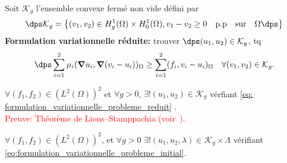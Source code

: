 \documentclass{beamer}
\begin{document}
\begin{frame}
\begin{definition}
Soit $\mathcal{K}_g$ l'ensemble convexe fermé non vide défini par
\vspace{-0.2 cm}
\begin{equation*}
\dps \mathcal{K}_g= \left\{(v_1,v_2)\in H_g^1(\Omega)\times H_0^1(\Omega), v_1-v_2 \geq 0 \quad \mbox{p.p} \quad \mbox{sur} 
\quad \Omega \dps \right\}
\end{equation*}
\textbf{Formulation variationnelle réduite:} trouver $\dps (u_1,u_2)\in \mathcal{K}_g$, tq   
\begin{equation}
\dps \sum_{i=1}^2 \mu_i ({\bm \nabla} u_i,{\bm \nabla} (v_i-u_i))_{\Omega} \geq \sum_{i=1}^2( f_i,v_i-u_i)_{\Omega} \quad \forall (v_1,v_2)\in \mathcal{K}_g.
\label{eq: formulation_variationnelle_probleme_reduit}
\end{equation}
\end{definition}
\begin{theorem}
$\forall (f_1,f_2) \in (L^2(\Omega))^2$ et $\forall g>0$, $\exists ! (u_1,u_2) \in  \displaystyle \mathcal{K}_g$ vérfiant \eqref{eq: formulation_variationnelle_probleme_reduit} .\\
\textcolor{red}{Preuve: Théorème de Lions--Stamppachia (voir~\cite{VorBer:2008}).}
\end{theorem}
\begin{corollary}
$\forall (f_1,f_2) \in (L^2(\Omega))^2$, et $\forall g>0$ $\exists ! (u_1,u_2,\lambda) \in  \displaystyle \mathcal{K}_g \times \Lambda$ vérifiant \eqref{eq:formulation_variationnelle_probleme_initial}.
\end{corollary}
\end{frame}
\end{document}
